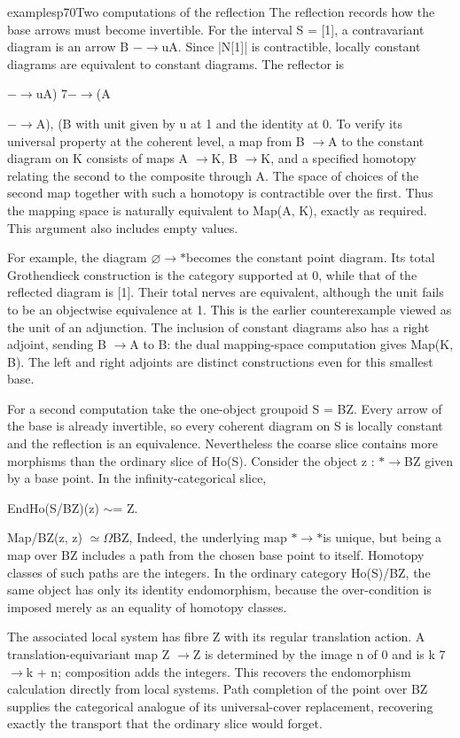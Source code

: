 \begin{dcomment}{examples}{p70}{Two computations of the reflection}
The reflection records how the base arrows must become invertible. For the interval S = [1], a contravariant diagram is an arrow B \ensuremath{-}\ensuremath{\to}uA. Since |N[1]| is contractible, locally constant diagrams are equivalent to constant diagrams. The reflector is

\ensuremath{-}\ensuremath{\to}uA) 7\ensuremath{-}\ensuremath{\to}(A

\ensuremath{-}\ensuremath{\to}A), (B with unit given by u at 1 and the identity at 0. To verify its universal property at the coherent level, a map from B \ensuremath{\to}A to the constant diagram on K consists of maps A \ensuremath{\to}K, B \ensuremath{\to}K, and a specified homotopy relating the second to the composite through A. The space of choices of the second map together with such a homotopy is contractible over the first. Thus the mapping space is naturally equivalent to Map(A, K), exactly as required. This argument also includes empty values.

For example, the diagram \ensuremath{\varnothing}\ensuremath{\to}\ensuremath{*}becomes the constant point diagram. Its total Grothendieck construction is the category supported at 0, while that of the reflected diagram is [1]. Their total nerves are equivalent, although the unit fails to be an objectwise equivalence at 1. This is the earlier counterexample viewed as the unit of an adjunction. The inclusion of constant diagrams also has a right adjoint, sending B \ensuremath{\to}A to B: the dual mapping-space computation gives Map(K, B). The left and right adjoints are distinct constructions even for this smallest base.

For a second computation take the one-object groupoid S = BZ. Every arrow of the base is already invertible, so every coherent diagram on S is locally constant and the reflection is an equivalence. Nevertheless the coarse slice contains more morphisms than the ordinary slice of Ho(S). Consider the object z : \ensuremath{*}\ensuremath{\to}BZ given by a base point. In the infinity-categorical slice,

EndHo(S/BZ)(z) \ensuremath{\sim}= Z.

Map/BZ(z, z) \ensuremath{\simeq}\ensuremath{\Omega}BZ, Indeed, the underlying map \ensuremath{*}\ensuremath{\to}\ensuremath{*}is unique, but being a map over BZ includes a path from the chosen base point to itself. Homotopy classes of such paths are the integers. In the ordinary category Ho(S)/BZ, the same object has only its identity endomorphism, because the over-condition is imposed merely as an equality of homotopy classes.

The associated local system has fibre Z with its regular translation action. A translation-equivariant map Z \ensuremath{\to}Z is determined by the image n of 0 and is k 7\ensuremath{\to}k + n; composition adds the integers. This recovers the endomorphism calculation directly from local systems. Path completion of the point over BZ supplies the categorical analogue of its universal-cover replacement, recovering exactly the transport that the ordinary slice would forget.

\end{dcomment}
